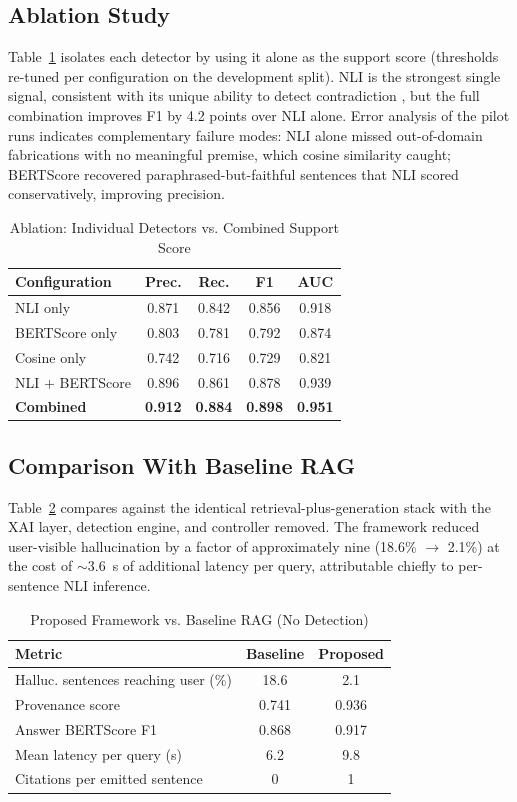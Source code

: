 \documentclass[journal]{IEEEtran}
\begin{document}
\subsection{Ablation Study}
Table~\ref{tab:ablation} isolates each detector by using it alone as the
support score (thresholds re-tuned per configuration on the development
split). NLI is the strongest single signal, consistent with its unique
ability to detect contradiction \cite{laban2022summac}, but the full
combination improves F1 by 4.2 points over NLI alone. Error analysis of the
pilot runs indicates complementary failure modes: NLI alone missed
out-of-domain fabrications with no meaningful premise, which cosine
similarity caught; BERTScore recovered paraphrased-but-faithful sentences
that NLI scored conservatively, improving precision.

\begin{table}[!t]
\caption{Ablation: Individual Detectors vs. Combined Support Score}
\label{tab:ablation}
\centering
\small
\begin{tabular}{@{}lcccc@{}}
\toprule
Configuration & Prec. & Rec. & F1 & AUC \\
\midrule
NLI only & 0.871 & 0.842 & 0.856 & 0.918 \\
BERTScore only & 0.803 & 0.781 & 0.792 & 0.874 \\
Cosine only & 0.742 & 0.716 & 0.729 & 0.821 \\
NLI $+$ BERTScore & 0.896 & 0.861 & 0.878 & 0.939 \\
\textbf{Combined} & \textbf{0.912} & \textbf{0.884} & \textbf{0.898} & \textbf{0.951} \\
\bottomrule
\end{tabular}
\end{table}

\subsection{Comparison With Baseline RAG}
Table~\ref{tab:baseline} compares against the identical
retrieval-plus-generation stack with the XAI layer, detection engine, and
controller removed. The framework reduced user-visible hallucination by a
factor of approximately nine (18.6\% $\rightarrow$ 2.1\%) at the cost of
$\sim$3.6~s of additional latency per query, attributable chiefly to
per-sentence NLI inference.

\begin{table}[!t]
\caption{Proposed Framework vs. Baseline RAG (No Detection)}
\label{tab:baseline}
\centering
\small
\begin{tabular}{@{}lcc@{}}
\toprule
Metric & Baseline & Proposed \\
\midrule
Halluc. sentences reaching user (\%) & 18.6 & 2.1 \\
Provenance score & 0.741 & 0.936 \\
Answer BERTScore F1 & 0.868 & 0.917 \\
Mean latency per query (s) & 6.2 & 9.8 \\
Citations per emitted sentence & 0 & 1 \\
\bottomrule
\end{tabular}
\end{table}
\end{document}

